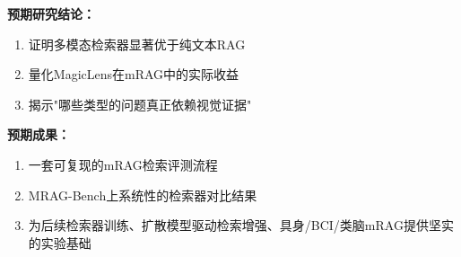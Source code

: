 \documentclass[12pt,a4paper]{article}
\begin{document}
\textbf{预期研究结论：}
\begin{enumerate}
\item 证明多模态检索器显著优于纯文本RAG
\item 量化MagicLens在mRAG中的实际收益
\item 揭示"哪些类型的问题真正依赖视觉证据"
\end{enumerate}

\textbf{预期成果：}
\begin{enumerate}
\item 一套可复现的mRAG检索评测流程
\item MRAG-Bench上系统性的检索器对比结果\cite{hu2024mragbench}
\item 为后续检索器训练、扩散模型驱动检索增强、具身/BCI/类脑mRAG提供坚实的实验基础\cite{xie2024embodiedrag,caria2025bci,genesis2025}
\end{enumerate}



\end{document}
